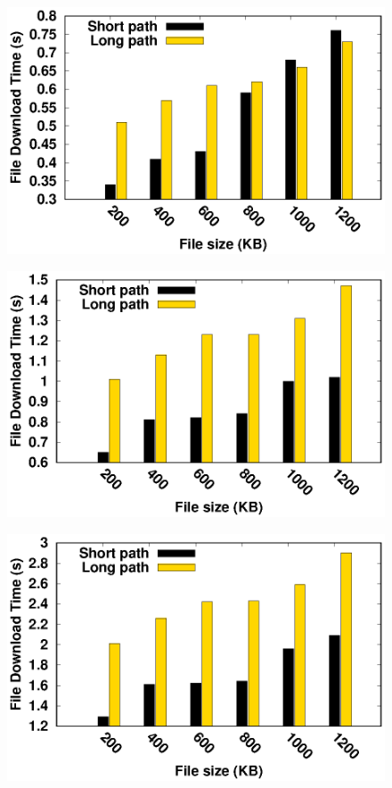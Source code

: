 \begin{figure}[!t]
	\begin{center}
		\begin{minipage}{0.45\linewidth}
			\centering
			\includegraphics[width=\linewidth]{img/exp5/time_needed_5}
			\label{fig:timeSentOverPathRTT80}
		\end{minipage}
		\begin{minipage}{0.45\linewidth}
			\centering
			\includegraphics[width=\linewidth]{img/exp5/time_needed_10}
			\label{fig:timeSentOverPathPathRTT160}
		\end{minipage}
		\begin{minipage}{0.45\linewidth}
			\centering
			\includegraphics[width=\linewidth]{img/exp5/time_needed_20}

\end{minipage}
\end{center}
\end{figure}
